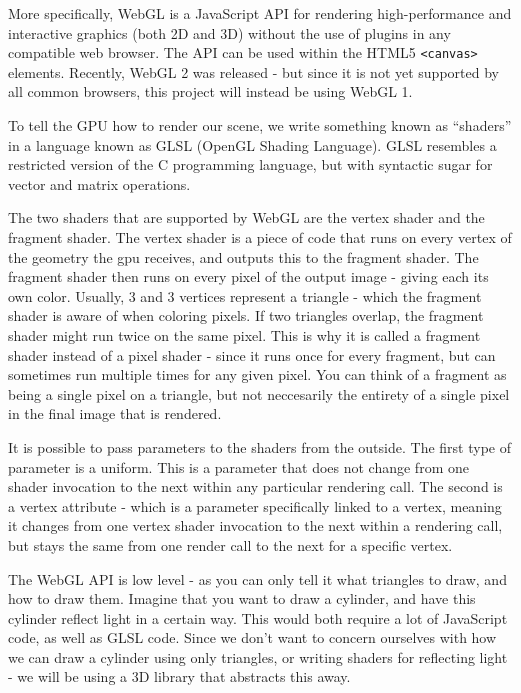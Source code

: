 More specifically, WebGL is a JavaScript API for rendering
high-performance and interactive graphics (both 2D and 3D) without the
use of plugins in any compatible web browser. The API can be used within
the HTML5 \texttt{\textless{}canvas\textgreater{}} elements. Recently,
WebGL 2 was released - but since it is not yet supported by all common
browsers, this project will instead be using WebGL 1.

To tell the GPU how to render our scene, we write something known as
``shaders'' in a language known as GLSL (OpenGL Shading Language). GLSL
resembles a restricted version of the C programming language, but with
syntactic sugar for vector and matrix operations.

The two shaders that are supported by WebGL are the vertex shader and
the fragment shader. The vertex shader is a piece of code that runs on
every vertex of the geometry the gpu receives, and outputs this to the
fragment shader. The fragment shader then runs on every pixel of the
output image - giving each its own color. Usually, 3 and 3 vertices
represent a triangle - which the fragment shader is aware of when
coloring pixels. If two triangles overlap, the fragment shader might run
twice on the same pixel. This is why it is called a fragment shader
instead of a pixel shader - since it runs once for every fragment, but
can sometimes run multiple times for any given pixel. You can think of a
fragment as being a single pixel on a triangle, but not neccesarily the
entirety of a single pixel in the final image that is rendered.

It is possible to pass parameters to the shaders from the outside. The
first type of parameter is a uniform. This is a parameter that does not
change from one shader invocation to the next within any particular
rendering call. The second is a vertex attribute - which is a parameter
specifically linked to a vertex, meaning it changes from one vertex
shader invocation to the next within a rendering call, but stays the
same from one render call to the next for a specific vertex.

The WebGL API is low level - as you can only tell it what triangles to
draw, and how to draw them. Imagine that you want to draw a cylinder,
and have this cylinder reflect light in a certain way. This would both
require a lot of JavaScript code, as well as GLSL code. Since we don't
want to concern ourselves with how we can draw a cylinder using only
triangles, or writing shaders for reflecting light - we will be using a
3D library that abstracts this away.

